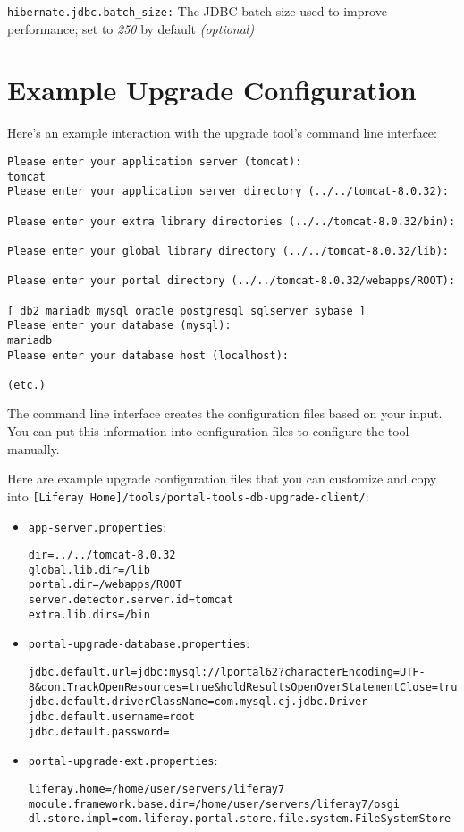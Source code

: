 \texttt{hibernate.jdbc.batch\_size:} The JDBC batch size used to improve
performance; set to \emph{250} by default \emph{(optional)}

\section{Example Upgrade
Configuration}\label{example-upgrade-configuration}

Here's an example interaction with the upgrade tool's command line
interface:

\begin{verbatim}
Please enter your application server (tomcat):
tomcat
Please enter your application server directory (../../tomcat-8.0.32):

Please enter your extra library directories (../../tomcat-8.0.32/bin):

Please enter your global library directory (../../tomcat-8.0.32/lib):

Please enter your portal directory (../../tomcat-8.0.32/webapps/ROOT):

[ db2 mariadb mysql oracle postgresql sqlserver sybase ]
Please enter your database (mysql):
mariadb
Please enter your database host (localhost):

(etc.)
\end{verbatim}

The command line interface creates the configuration files based on your
input. You can put this information into configuration files to
configure the tool manually.

Here are example upgrade configuration files that you can customize and
copy into
\texttt{{[}Liferay\ Home{]}/tools/portal-tools-db-upgrade-client/}:

\begin{itemize}
\item
  \texttt{app-server.properties}:

\begin{verbatim}
dir=../../tomcat-8.0.32
global.lib.dir=/lib
portal.dir=/webapps/ROOT
server.detector.server.id=tomcat
extra.lib.dirs=/bin
\end{verbatim}
\item
  \texttt{portal-upgrade-database.properties}:

\begin{verbatim}
jdbc.default.url=jdbc:mysql://lportal62?characterEncoding=UTF-8&dontTrackOpenResources=true&holdResultsOpenOverStatementClose=true&serverTimezone=GMT&useFastDateParsing=false&useUnicode=true
jdbc.default.driverClassName=com.mysql.cj.jdbc.Driver
jdbc.default.username=root
jdbc.default.password=
\end{verbatim}
\item
  \texttt{portal-upgrade-ext.properties}:

\begin{verbatim}
liferay.home=/home/user/servers/liferay7
module.framework.base.dir=/home/user/servers/liferay7/osgi
dl.store.impl=com.liferay.portal.store.file.system.FileSystemStore
\end{verbatim}
\end{itemize}

